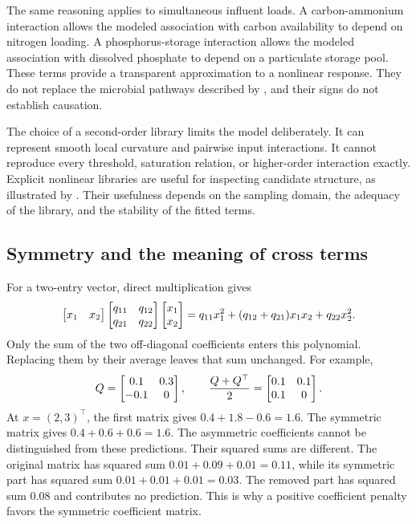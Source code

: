 The same reasoning applies to simultaneous influent loads. A carbon-ammonium interaction allows the modeled association with carbon availability to depend on nitrogen loading. A phosphorus-storage interaction allows the modeled association with dissolved phosphate to depend on a particulate storage pool. These terms provide a transparent approximation to a nonlinear response. They do not replace the microbial pathways described by \citet{Henze1999}, and their signs do not establish causation.

The choice of a second-order library limits the model deliberately. It can represent smooth local curvature and pairwise input interactions. It cannot reproduce every threshold, saturation relation, or higher-order interaction exactly. Explicit nonlinear libraries are useful for inspecting candidate structure, as illustrated by \citet{Brunton2016}. Their usefulness depends on the sampling domain, the adequacy of the library, and the stability of the fitted terms.

\subsection{Symmetry and the meaning of cross terms}

For a two-entry vector, direct multiplication gives
\begin{equation}
\equationname{Expansion of a two-variable quadratic form}
\label{eq:icsor_scalar_quadratic}
\begin{bmatrix}x_1&x_2\end{bmatrix}
\begin{bmatrix}q_{11}&q_{12}\\q_{21}&q_{22}\end{bmatrix}
\begin{bmatrix}x_1\\x_2\end{bmatrix}
=q_{11}x_1^2+(q_{12}+q_{21})x_1x_2+q_{22}x_2^2.
\end{equation}
Only the sum of the two off-diagonal coefficients enters this polynomial. Replacing them by their average leaves that sum unchanged. For example,
\begin{equation}
\equationname{Numerical example of quadratic-coefficient symmetrization}
\label{eq:icsor_symmetry_numbers}
Q=\begin{bmatrix}0.1&0.3\\-0.1&0\end{bmatrix},
\qquad
\frac{Q+Q^\top}{2}=\begin{bmatrix}0.1&0.1\\0.1&0\end{bmatrix}.
\end{equation}
At \(x=(2,3)^\top\), the first matrix gives \(0.4+1.8-0.6=1.6\). The symmetric matrix gives \(0.4+0.6+0.6=1.6\). The asymmetric coefficients cannot be distinguished from these predictions. Their squared sums are different. The original matrix has squared sum \(0.01+0.09+0.01=0.11\), while its symmetric part has squared sum \(0.01+0.01+0.01=0.03\). The removed part has squared sum 0.08 and contributes no prediction. This is why a positive coefficient penalty favors the symmetric coefficient matrix.

